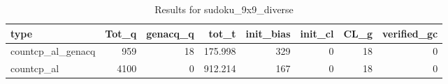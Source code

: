 \begin{table}[ht]
\caption{Results for sudoku_9x9_diverse}
\begin{tabular}{lrrrrrrr}
\hline
 type              &   Tot\_q &   genacq\_q &   tot\_t &   init\_bias &   init\_cl &   CL\_g &   verified\_gc \\
\hline
 countcp\_al\_genacq &     959 &         18 & 175.998 &         329 &         0 &     18 &             0 \\
 countcp\_al        &    4100 &          0 & 912.214 &         167 &         0 &     18 &             0 \\
\hline
\end{tabular}
\end{table}
